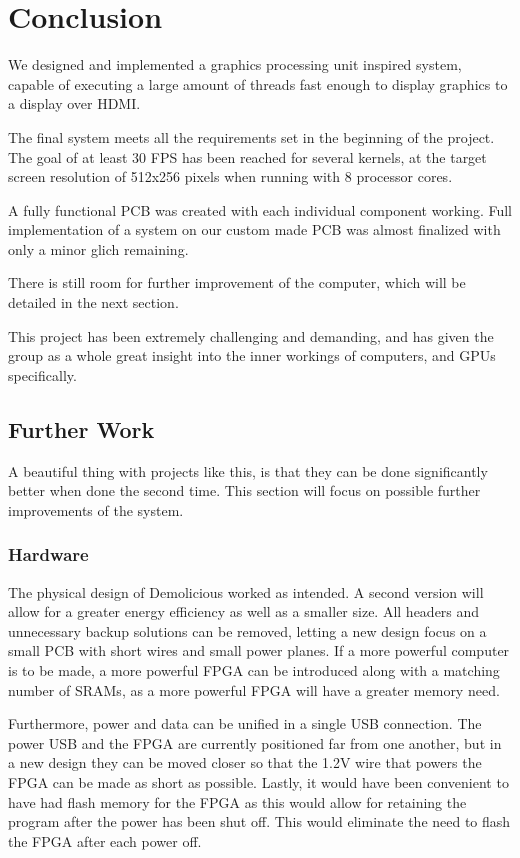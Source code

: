 \documentclass[../main/report.tex]{subfiles}
\begin{document}
\chapter{Conclusion}

We designed and implemented a graphics processing unit inspired system,
capable of executing a large amount of threads fast enough to display graphics to a display over HDMI.

The final system meets all the requirements set in the beginning of the project.
The goal of at least 30 FPS has been reached for several kernels,
at the target screen resolution of 512x256 pixels when running with 8 processor cores.

A fully functional PCB was created with each individual component working.
Full implementation of a system on our custom made PCB was almost finalized with only a minor glich remaining.

There is still room for further improvement of the computer, which will be detailed in the next section.

This project has been extremely challenging and demanding,
and has given the group as a whole great insight into the inner workings of computers,
and GPUs specifically.

\section{Further Work}

A beautiful thing with projects like this, is that they can be done significantly better when done the second time.
This section will focus on possible further improvements of the system.

\subsection{Hardware}
The physical design of Demolicious worked as intended.
A second version will allow for a greater energy efficiency as well as a smaller size.
All headers and unnecessary backup solutions can be removed, letting a new design focus on a small PCB with short wires and small power planes.
If a more powerful computer is to be made, a more powerful FPGA can be introduced along with a matching number of SRAMs, as a more powerful FPGA will have a greater memory need.

Furthermore, power and data can be unified in a single USB connection.
The power USB and the FPGA are currently positioned far from one another, but in a new design they can be moved closer so that the 1.2V wire that powers the FPGA can be made as short as possible.
Lastly, it would have been convenient to have had flash memory for the FPGA as this would allow for retaining the program after the power has been shut off.
This would eliminate the need to flash the FPGA after each power off.
\end{document}
